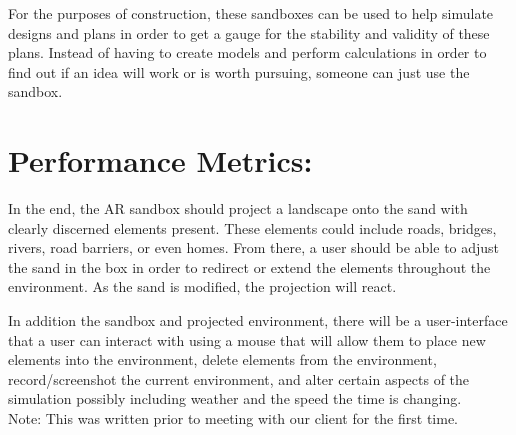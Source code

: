 \documentclass[10pt]{article}
\begin{document}
	For the purposes of construction, these sandboxes can be used to help simulate designs and plans in order to get a gauge for the stability and validity of these plans.  Instead of having to create models and perform calculations in order to find out if an idea will work or is worth pursuing, someone can just use the sandbox.

\section{Performance Metrics:}

	In the end, the AR sandbox should project a landscape onto the sand with clearly discerned elements present.  These elements could include roads, bridges, rivers, road barriers, or even homes.  From there, a user should be able to adjust the sand in the box in order to redirect or extend the elements throughout the environment.  As the sand is modified, the projection will react.  

	In addition the sandbox and projected environment, there will be a user-interface that a user can interact with using a mouse that will allow them to place new elements into the environment, delete elements from the environment, record/screenshot the current environment, and alter certain aspects of the simulation possibly including weather and the speed the time is changing.\\

Note: This was written prior to meeting with our client for the first time.
\end{document}
